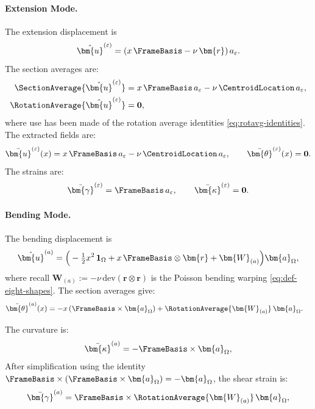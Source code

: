 \paragraph{Extension Mode.}
The extension displacement is
\begin{equation*}
\hat{\bm{u}}^{(\varepsilon)} = (x\,\FrameBasis - \nu\,\bm{r})\,a_{\varepsilon}.
\end{equation*}
The section averages are:
\begin{align*}
\SectionAverage{\hat{\bm{u}}^{(\varepsilon)}} &= x\,\FrameBasis\,a_\varepsilon - \nu\,\CentroidLocation\,a_\varepsilon, \\
\RotationAverage{\hat{\bm{u}}^{(\varepsilon)}} &= \mathbf{0},
\end{align*}
where use has been made of the rotation average identities \eqref{eq:rotavg-identities}. 
The extracted fields are:
\begin{equation*}
\bar{\bm{u}}^{(\varepsilon)}(x) = x\,\FrameBasis\,a_\varepsilon - \nu\,\CentroidLocation\,a_\varepsilon, 
\qquad 
\bar{\bm{\theta}}^{(\varepsilon)}(x) = \mathbf{0}.
\end{equation*}
The strains are:
\begin{equation*}
\bar{\bm{\gamma}}^{(\varepsilon)} = \FrameBasis\,a_\varepsilon, 
\qquad 
\bar{\bm{\kappa}}^{(\varepsilon)} = \mathbf{0}.
\end{equation*}

\paragraph{Bending Mode.} 
The bending displacement is
\begin{equation*}
\hat{\bm{u}}^{(a)} = \Big( -\tfrac{1}{2}x^2\,\mathbf{1}_\Omega 
+ x\,\FrameBasis \otimes \bm{r} 
+ \bm{W}_{(a)} \Big) \bm{a}_\Omega,
\end{equation*}
where recall $\bm{W}_{(a)} := -\nu\,\mathrm{dev}(\bm{r} \otimes \bm{r})$ is the 
Poisson bending warping \eqref{eq:def-eight-shapes}. 
The section averages give:
\begin{align*}
\bar{\bm{\theta}}^{(a)}(x) &= -x\,(\FrameBasis \times \bm{a}_\Omega) 
+ \RotationAverage{\bm{W}_{(a)}}\,\bm{a}_\Omega.
\end{align*}

The curvature is:
\begin{equation*}
\bar{\bm{\kappa}}^{(a)} = -\FrameBasis \times \bm{a}_\Omega,
\end{equation*}
After simplification using the identity 
$\FrameBasis \times (\FrameBasis \times \bm{a}_\Omega) = -\bm{a}_\Omega$, 
the shear strain is:
\begin{equation*}
\bar{\bm{\gamma}}^{(a)} = \FrameBasis \times \RotationAverage{\bm{W}_{(a)}}\,\bm{a}_\Omega,
\end{equation*}

